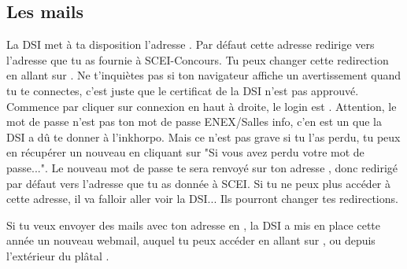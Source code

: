 




\subsection{Les mails}

La DSI met à ta disposition l'adresse . Par défaut cette adresse redirige vers l'adresse que tu as fournie à SCEI-Concours. Tu peux changer cette redirection en allant sur . Ne t'inquiètes pas si ton navigateur affiche un avertissement quand tu te connectes, c'est juste que le certificat de la DSI n'est pas approuvé. Commence par cliquer sur connexion en haut à droite, le login est . Attention, le mot de passe n'est pas ton mot de passe ENEX/Salles info, c'en est un que la DSI a dû te donner à l'inkhorpo. Mais ce n'est pas grave si tu l'as perdu, tu peux en récupérer un nouveau en cliquant sur "Si vous avez perdu votre mot de passe...". Le nouveau mot de passe te sera renvoyé sur ton adresse , donc redirigé par défaut vers l'adresse que tu as donnée à SCEI. Si tu ne peux plus accéder à cette adresse, il va falloir aller voir la DSI... Ils pourront changer tes redirections.

Si tu veux envoyer des mails avec ton adresse en , la DSI a mis en place cette année un nouveau webmail, auquel tu peux accéder en allant sur , ou depuis l'extérieur du plâtal . 

